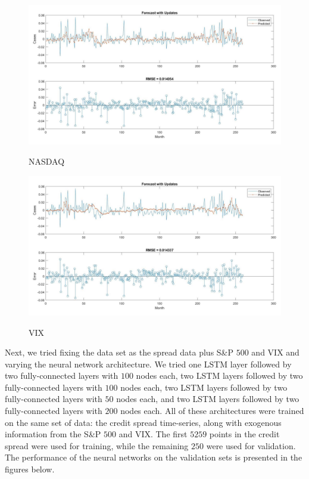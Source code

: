 \documentclass[12pt]{article}
\begin{document}
    \begin{minipage}{0.5\textwidth}
        \begin{figure}[H]
            \centering
            \caption{NASDAQ}
            \includegraphics[scale=0.28]{../shreya/lstm3.pdf}
            \label{fig:LSTM-shreya-3}
        \end{figure}
    \end{minipage}
    \begin{minipage}{0.5\textwidth}
        \begin{figure}[H]
            \centering
            \caption{VIX}
            \includegraphics[scale=0.28]{../shreya/lstm6.pdf}
            \label{fig:LSTM-shreya-6}
        \end{figure}
    \end{minipage}

    Next, we tried fixing the data set as the spread data plus S\&P $500$ and VIX and varying the neural network architecture.
    We tried one LSTM layer followed by two fully-connected layers with $100$ nodes each,
    two LSTM layers followed by two fully-connected layers with $100$ nodes each,
    two LSTM layers followed by two fully-connected layers with $50$ nodes each,
    and two LSTM layers followed by two fully-connected layers with $200$ nodes each.
    All of these architectures were trained on the same set of data:
    the credit spread time-series, along with exogenous information from the S\&P $500$ and VIX.
    The first $5259$ points in the credit spread were used for training, while the remaining $250$ were used for validation.
    The performance of the neural networks on the validation sets is presented in the figures below.
\end{document}
